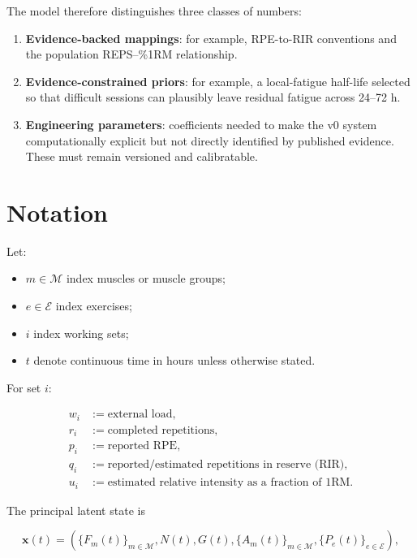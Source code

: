 \documentclass[11pt]{article}
\begin{document}
The model therefore distinguishes three classes of numbers:

\begin{enumerate}
    \item \textbf{Evidence-backed mappings}: for example, RPE-to-RIR conventions and the population REPS--\%1RM relationship.
    \item \textbf{Evidence-constrained priors}: for example, a local-fatigue half-life selected so that difficult sessions can plausibly leave residual fatigue across 24--72 h.
    \item \textbf{Engineering parameters}: coefficients needed to make the v0 system computationally explicit but not directly identified by published evidence. These must remain versioned and calibratable.
\end{enumerate}

\section{Notation}

Let:

\begin{itemize}
    \item $m\in\mathcal{M}$ index muscles or muscle groups;
    \item $e\in\mathcal{E}$ index exercises;
    \item $i$ index working sets;
    \item $t$ denote continuous time in hours unless otherwise stated.
\end{itemize}

For set $i$:

\begin{align*}
w_i &:= \text{external load},\\
r_i &:= \text{completed repetitions},\\
p_i &:= \text{reported RPE},\\
q_i &:= \text{reported/estimated repetitions in reserve (RIR)},\\
u_i &:= \text{estimated relative intensity as a fraction of 1RM}.
\end{align*}

The principal latent state is

\begin{equation}
\mathbf{x}(t)=\left(
\{F_m(t)\}_{m\in\mathcal M},
N(t),G(t),
\{A_m(t)\}_{m\in\mathcal M},
\{P_e(t)\}_{e\in\mathcal E}
\right),
\end{equation}
\end{document}
